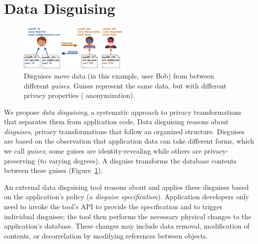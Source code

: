 \section{Data Disguising}
\begin{figure}[t]
    \centering
    \includegraphics[width=0.47\textwidth]{img/disguises_new}

    \caption{Disguises move data (in this example, user Bob) from
             between different \emph{guises}. Guises represent the
             same data, but with different privacy properties (\eg
             anonymization).}
    \label{fig:example}
\end{figure}

%
We propose \emph{data disguising}, a systematic approach to privacy
transformations that separates them from application code.
%
Data disguising reasons about \emph{disguises}, privacy transformations that
follow an organized structure.
%
Disguises are based on the observation that application data can take
different forms, which we call \emph{guises}; some guises are identity-revealing while others are
privacy-preserving (to varying degrees).
%
%
A disguise transforms the database contents between these guises
(Figure~\ref{fig:example}).
%
%
%
%

%
An external data disguising tool reasons about and applies these disguises
based on the application's policy (a \emph{disguise specification}).
%
Application developers only need to invoke the tool's API to provide the
specification and to trigger individual disguises; the tool then performs the
necessary physical changes to the application's database.
%
These changes may include data removal, modification of contents, or
decorrelation by modifying references between objects.
%


